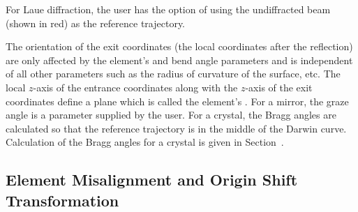 For Laue diffraction, the user has the option of using the
undiffracted beam (shown in red) as the reference trajectory.

The orientation of the exit coordinates (the local coordinates after
the reflection) are only affected by the element's  and
bend angle parameters and is independent of all other parameters such
as the radius of curvature of the surface, etc. The local $z$-axis of
the entrance coordinates along with the $z$-axis of the exit
coordinates define a plane which is called the element's .  For a mirror, the graze angle is a parameter supplied by the
user. For a crystal, the Bragg angles are calculated so that the
reference trajectory is in the middle of the Darwin curve. Calculation
of the Bragg angles for a crystal is given in
Section~.

\subsection{Element Misalignment and Origin Shift Transformation}
\label{s:patch.coords}


